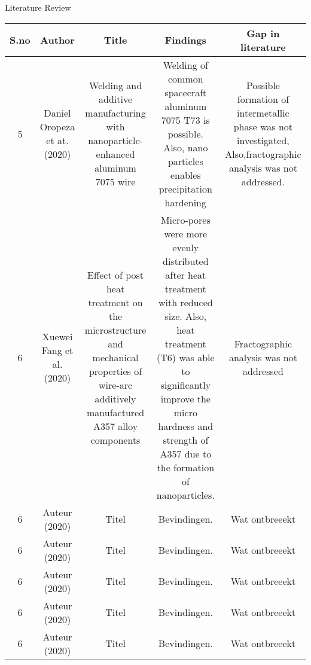 \begin{frame}[shrink=40]{Literature Review}
	\begin{table}[htbp]
		\centering
		\begin{tabular}{|c|c|c|c|c|}\hline
			S.no&Author&Title&Findings&Gap in literature\\\hline
			5&\multicolumn{1}{m{2cm}|}{Daniel Oropeza et at. (2020) \cite{10}}&\multicolumn{1}{m{4cm}|}{Welding and additive manufacturing with nanoparticle-enhanced aluminum 7075 wire}&
			\multicolumn{1}{m{4cm}|}{Welding of common spacecraft aluminum 7075 T73 is possible. Also, nano particles enables precipitation hardening }&\multicolumn{1}{m{4cm}|}{Possible formation of intermetallic phase was not investigated, Also,fractographic analysis was not addressed.}\\\hline
			
			6&\multicolumn{1}{m{2cm}|}{Xuewei Fang et al. (2020) \cite{11}}&\multicolumn{1}{m{4cm}|}{Effect of post heat treatment on the microstructure and mechanical properties of wire-arc additively manufactured A357 alloy components}&\multicolumn{1}{m{4cm}|}{Micro-pores were more evenly distributed after heat treatment with reduced size. Also, heat treatment (T6) was able to significantly improve the micro hardness and strength of A357 due to the formation of nanoparticles.}&\multicolumn{1}{m{4cm}|}{Fractographic analysis was not addressed}\\\hline
			
			
			6&\multicolumn{1}{m{2cm}|}{Auteur (2020) \cite{11}}&\multicolumn{1}{m{4cm}|}{Titel}&\multicolumn{1}{m{4cm}|}{Bevindingen.}&\multicolumn{1}{m{4cm}|}{Wat ontbreeekt}\\\hline
			
			6&\multicolumn{1}{m{2cm}|}{Auteur (2020) \cite{11}}&\multicolumn{1}{m{4cm}|}{Titel}&\multicolumn{1}{m{4cm}|}{Bevindingen.}&\multicolumn{1}{m{4cm}|}{Wat ontbreeekt}\\\hline
			
			
			6&\multicolumn{1}{m{2cm}|}{Auteur (2020) \cite{11}}&\multicolumn{1}{m{4cm}|}{Titel}&\multicolumn{1}{m{4cm}|}{Bevindingen.}&\multicolumn{1}{m{4cm}|}{Wat ontbreeekt}\\\hline
			
			
			6&\multicolumn{1}{m{2cm}|}{Auteur (2020) \cite{11}}&\multicolumn{1}{m{4cm}|}{Titel}&\multicolumn{1}{m{4cm}|}{Bevindingen.}&\multicolumn{1}{m{4cm}|}{Wat ontbreeekt}\\\hline
			
			
			6&\multicolumn{1}{m{2cm}|}{Auteur (2020) \cite{11}}&\multicolumn{1}{m{4cm}|}{Titel}&\multicolumn{1}{m{4cm}|}{Bevindingen.}&\multicolumn{1}{m{4cm}|}{Wat ontbreeekt}\\\hline
			

\end{tabular}
\end{table}
\end{frame}
